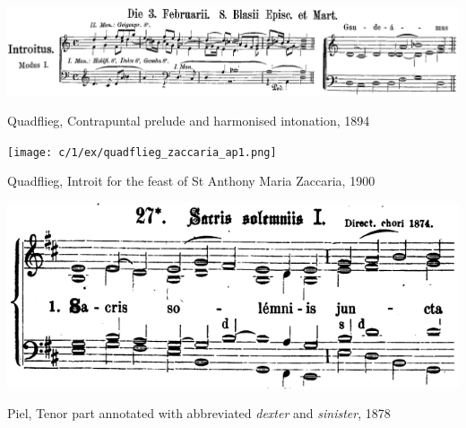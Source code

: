 \begin{landscape}

\vspace*{\fill}

  \begin{example}
    \centering
    \includegraphics[width=.8\linewidth]{c/1/ex/quadflieg_supplement_(45).png}
    \caption{Quadflieg, Contrapuntal prelude and harmonised intonation, 1894}
    \label{mus:quadflieg_supplement_(45)}
  \end{example}

  \vspace*{\fill}

\end{landscape}

\begin{landscape}

  \vspace*{\fill}

  \begin{example}
    \centering
    \texttt{[image: c/1/ex/quadflieg\_zaccaria\_ap1.png]}
    \caption{Quadflieg, Introit for the feast of St Anthony Maria Zaccaria, 1900}
    \label{mus:quadflieg_zaccaria_ap1}
  \end{example}

\vspace*{\fill}

\end{landscape}

\vspace*{\fill}

\begin{example}
  \centering
  \includegraphics[width=.7\linewidth]{c/3/ex/piel_mohr_cantiones_56.png}
  \caption{Piel, Tenor part annotated with abbreviated \emph{dexter} and \emph{sinister}, 1878}
  \label{mus:mohrpiel_cantiones_56}
\end{example}

